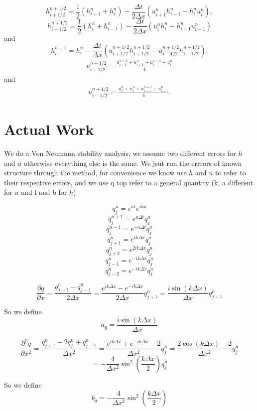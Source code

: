 \documentclass[12pt]{article}
\begin{document}
	\[
	h^{n + 1/2}_{i+ 1/2} = \frac{1}{2}\left(h^{n}_{i+1} + h^{n}_i\right) - \frac{\Delta t}{2\Delta x}\left(u^n_{i+1}h^n_{i+1} - h^n_{i}u^n_{i}\right),
	\]
	\[
	h^{n + 1/2}_{i- 1/2} = \frac{1}{2}\left(h^{n}_{i} + h^{n}_{i-1}\right) - \frac{\Delta t}{2\Delta x}\left(u^n_{i}h^n_{i} - h^n_{i-1}u^n_{i-1}\right)
	\]
	and
	$$
	h^{n+1}_i = h^{n}_i - \frac{\Delta t}{\Delta x}\left(u^{n + 1/2}_{i+ 1/2}h^{n + 1/2}_{i+ 1/2} - u^{n + 1/2}_{i- 1/2}h^{n + 1/2}_{i- 1/2}\right).
	$$
\begin{gather}
u^{n + 1/2}_{i+ 1/2} = \frac{u^{n+1}_{i+1} + u^{n}_{i+1} + u^{n+1}_{i} + u^{n}_{i} }{4}
\end{gather}
and
\begin{gather}
u^{n + 1/2}_{i- 1/2} = \frac{u^{n}_{i} + u^{n}_{i} + u^{n+1}_{i-1}+ u^{n}_{i-1} }{4}.
\end{gather}


\section{Actual Work}
We do a Von Neumann stability analysis, we assume two different errors for $h$ and $u$ otherwise everything else is the same. We jsut run the errrors of known structure through the method, for convenience we know use $h$ and $u$ to refer to their respective errors, and we use q top refer to a general quantity (k, a different for $u$ and l and b for $h$)

$$q^n_j = e^{at} e^{ikx}$$
$$q^{n+1}_j = e^{a\Delta t}q^n_j $$
$$q^{n-1}_j = e^{-a\Delta t}q^n_j $$
$$q^{n}_{j+1} = e^{ik\Delta x}q^n_j $$
$$q^{n}_{j+2} = e^{2ik\Delta x}q^n_j $$
$$q^{n}_{j-1} = e^{-ik\Delta x}q^n_j $$
$$q^{n}_{j-2} = e^{-ik\Delta x}q^n_j $$


\[\frac{\partial q}{\partial x} = \frac{q^{n}_{j+1} - q^{n}_{j-1}}{2\Delta x} =\frac{e^{ik\Delta x} - e^{-ik\Delta x}}{2\Delta x} q^{n}_{j+1} = \frac{i \sin\left(k \Delta x\right)}{\Delta x}q^{n}_{j+1} \]

So we define
\[a_q = \frac{i \sin\left(k \Delta x\right)}{\Delta x}\]

\[\frac{\partial^2 q}{\partial x^2} = \frac{q^{n}_{j+1} -2q^{n}_{j} +q^{n}_{j-1}}{\Delta x^2} =\frac{e^{ik\Delta x} + e^{-ik\Delta x} - 2}{\Delta x^2} q^{n}_{j} = \frac{2 \cos\left(k\Delta x\right) - 2}{\Delta x^2} q^{n}_{j} \]
\[= -\frac{4}{\Delta x^2}\sin^2\left(\frac{k\Delta x}{2}\right) q^{n}_{j} \]

So we define 
\[b_q = -\frac{4}{\Delta x^2}\sin^2\left(\frac{k\Delta x}{2}\right) \]
\end{document}
